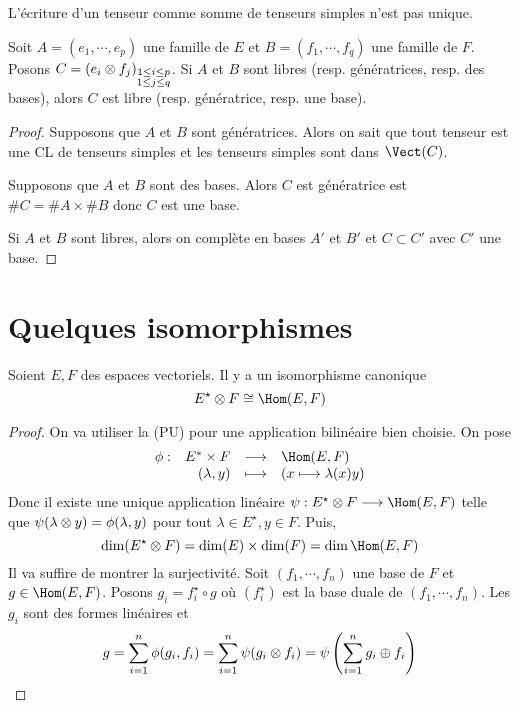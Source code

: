\begin{rem}
L'écriture d'un tenseur comme somme de tenseurs simples n'est pas unique.
\end{rem}

\begin{prop}
    Soit $A=(e_1, \cdots , e_p)$ une famille de $E$ et  $B=(f_1, \cdots , f_q)$ une famille de $F$. Posons  $C=(e_i\otimes f_j)_{\substack{1\leq i\leq p\\1\leq j\leq q}}$. Si $A$ et  $B$ sont libres (resp. génératrices, resp. des bases), alors  $C$ est libre (resp. génératrice, resp. une base).
\end{prop}

\begin{proof}
    Supposons que $A$ et  $B$ sont génératrices. Alors on sait que tout tenseur est une CL de tenseurs simples et les tenseurs simples sont dans  $\Vect(C)$.

    Supposons que $A$ et  $B$ sont des bases. Alors  $C$ est génératrice est  $\#C=\#A\times \#B$ donc  $C$ est une base.

    Si  $A$ et  $B$ sont libres, alors on complète en bases  $A'$ et  $B'$ et  $C\subset C'$ avec  $C'$ une base.
\end{proof}

\section{Quelques isomorphismes}

\begin{prop}
Soient $E, F$ des espaces vectoriels. Il y a un isomorphisme canonique \[
    E^\star \tens F\cong \Hom(E, F)
\] 
\end{prop}

\begin{proof}
    On va utiliser la (PU) pour une application bilinéaire bien choisie. On pose \[
    \begin{array}{rrcl}
        \phi:& E^* \times F& \longrightarrow & \Hom(E, F) \\
             & (\lambda, y) & \longmapsto & \displaystyle (x \longmapsto \lambda(x)y)
    \end{array}
    \] 
    Donc il existe une unique application linéaire $\psi : E^\star \tens F \longrightarrow \Hom(E, F)$ telle que $\psi(\lambda\otimes y)=\phi(\lambda, y)$ pour tout  $\lambda \in  E^\star, y \in  F$. Puis, \[
        \dim(E^\star\tens F)=\dim (E)\times \dim (F)=\dim\Hom(E, F)
    \] 
    Il va suffire de montrer la surjectivité. Soit $(f_1, \cdots , f_n)$ une base de $F$ et  $g \in \Hom(E, F)$. Posons $g_i=f_i^\star\circ g$ où $(f_i^\star)$ est la base duale de  $(f_1, \cdots , f_n)$. Les $g_i$ sont des formes linéaires et \[
        g=\sum_{i=1}^n \phi(g_i, f_i)=\sum_{i=1}^n\psi(g_i\otimes f_i)=\psi\left(\sum_{i=1}^n g_i\oplus f_i\right)
    \] 
\end{proof}

